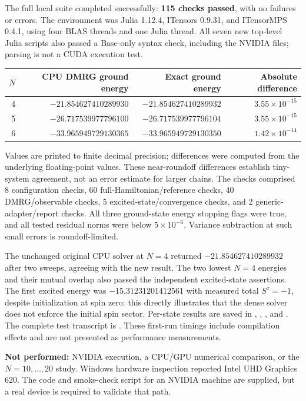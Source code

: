 The full local suite completed successfully: \textbf{115 checks passed}, with no failures or errors. The environment was Julia 1.12.4, ITensors 0.9.31, and ITensorMPS 0.4.1, using four BLAS threads and one Julia thread. All seven new top-level Julia scripts also passed a Base-only syntax check, including the NVIDIA files; parsing is not a CUDA execution test.

\begin{center}
\begin{tabular}{rrrr}
\toprule
$N$ & CPU DMRG ground energy & Exact ground energy & Absolute difference\\
\midrule
4 & $-21.854627410289930$ & $-21.854627410289932$ & $3.55\times10^{-15}$\\
5 & $-26.717539977796100$ & $-26.717539977796104$ & $3.55\times10^{-15}$\\
6 & $-33.965949729130365$ & $-33.965949729130350$ & $1.42\times10^{-14}$\\
\bottomrule
\end{tabular}
\end{center}
Values are printed to finite decimal precision; differences were computed from the underlying floating-point values. These near-roundoff differences establish tiny-system agreement, not an error estimate for larger chains. The checks comprised 8 configuration checks, 60 full-Hamiltonian/reference checks, 40 DMRG/observable checks, 5 excited-state/convergence checks, and 2 generic-adapter/report checks. All three ground-state energy stopping flags were true, and all tested residual norms were below $5\times10^{-6}$. Variance subtraction at such small errors is roundoff-limited.

The unchanged original CPU solver at $N=4$ returned $-21.854627410289932$ after two sweeps, agreeing with the new result. The two lowest $N=4$ energies and their mutual overlap also passed the independent excited-state assertions. The first excited energy was $-15.31231201412561$ with measured total $S^z=-1$, despite initialization at spin zero: this directly illustrates that the dense solver does not enforce the initial spin sector. Per-state results are saved in , , , and . The complete test transcript is . These first-run timings include compilation effects and are not presented as performance measurements.

\textbf{Not performed:} NVIDIA execution, a CPU/GPU numerical comparison, or the $N=10,\ldots,20$ study. Windows hardware inspection reported Intel UHD Graphics 620. The code and smoke-check script for an NVIDIA machine are supplied, but a real device is required to validate that path.
